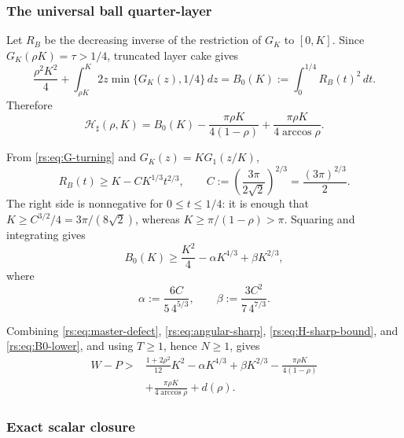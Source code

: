 \subsubsection*{The universal ball quarter-layer}

Let $R_B$ be the decreasing inverse of the restriction of $G_K$ to
$[0,K]$.  Since
$G_K(\rho K)=\tau>1/4$, truncated layer cake gives
\begin{equation}
 \frac{\rho^2K^2}{4}
 +\int_{\rho K}^K2z\min\{G_K(z),1/4\}\,dz
 =B_0(K):=\int_0^{1/4}R_B(t)^2\,dt.
 \label{rs:eq:ball-layer}
\end{equation}
Therefore
\begin{equation}
 \mathcal H_\sharp(\rho,K)
 =B_0(K)-\frac{\pi\rho K}{4(1-\rho)}
 +\frac{\pi\rho K}{4\arccos\rho}.
 \label{rs:eq:H-ball}
\end{equation}

From \eqref{rs:eq:G-turning} and $G_K(z)=KG_1(z/K)$,
\begin{equation}
 R_B(t)\geq K-C K^{1/3}t^{2/3},
 \qquad
 C:=\left(\frac{3\pi}{2\sqrt2}\right)^{2/3}
   =\frac{(3\pi)^{2/3}}2.
 \label{rs:eq:ball-inverse}
\end{equation}
The right side is nonnegative for $0\leq t\leq1/4$: it is enough that
$K\geq C^{3/2}/4=3\pi/(8\sqrt2)$, whereas
$K\geq\pi/(1-\rho)>\pi$.  Squaring and integrating gives
\begin{equation}
 B_0(K)\geq\frac{K^2}{4}-\alpha K^{4/3}+\beta K^{2/3},
 \label{rs:eq:B0-lower}
\end{equation}
where
\begin{equation}
 \alpha:=\frac{6C}{5\,4^{5/3}},
 \qquad
 \beta:=\frac{3C^2}{7\,4^{7/3}}.
 \label{rs:eq:alpha-beta}
\end{equation}

Combining \eqref{rs:eq:master-defect},
\eqref{rs:eq:angular-sharp}, \eqref{rs:eq:H-sharp-bound}, and
\eqref{rs:eq:B0-lower}, and using $T\geq1$, hence $N\geq1$, gives
\begin{equation}
 \begin{aligned}
 W-P>{}&\frac{1+2\rho^2}{12}K^2
 -\alpha K^{4/3}+\beta K^{2/3}
 -\frac{\pi\rho K}{4(1-\rho)}\\
 &+\frac{\pi\rho K}{4\arccos\rho}+d(\rho).
 \end{aligned}
 \label{rs:eq:pre-scalar-gap}
\end{equation}

\subsubsection*{Exact scalar closure}

